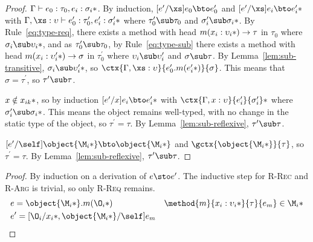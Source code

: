 \begin{theorem}[Preservation]
\begin{lemma}
\begin{proof}
      $\Gamma \vdash e_0 : \tau_0, \*e_i : \sigma_i*$.  By induction,
      $[e^\prime/\xs]e_0 \bto e^\prime_0$ and $\*[e^\prime/\xs]e_i \bto
      e^\prime_i*$ with $\Gamma, \xs : \upsilon \vdash e^\prime_0 :
      \tau_0^\prime, \*e^\prime_i : \sigma_i^\prime*$ where $\tau_0^\prime \sub
      \tau_0$ and $\*\sigma_i^\prime \sub \sigma_i*$.  By
      Rule~\ref{eq:type-req}, there exists a method with head $m(\*x_i :
      \upsilon_i*) \to \tau$ in $\tau_0$ where $\*\sigma_i \sub \upsilon_i*$,
      and as $\tau_0^\prime \sub \tau_0$, by Rule~\ref{eq:type-sub} there exists
      a method with head $m(\*x_i : \upsilon_i^\prime*) \to \sigma$ in
      $\tau_0^\prime$ where $\upsilon_i \sub \upsilon_i^\prime$ and
      $\sigma \sub \tau$.  By Lemma~\ref{lem:sub-transitive}, $\*\sigma_i
      \sub \upsilon_i^\prime*$, so $\ctx{\Gamma, \xs :
      \upsilon}{e_0^\prime.m(\*e_i^\prime*)}{\sigma}$.  This means that $\sigma
      = \tau^\prime$, so $\tau^\prime \sub \tau$.

      $x \notin \*x_{ik}*$, so by induction $\*[e^\prime/x]e_i \bto e_i^\prime*$
      with $\*\ctx{\Gamma, x : \upsilon}{e_i^\prime}{\sigma_i^\prime}*$ where
      $\*\sigma_i^\prime \sub \sigma_i*$.  This means the object remains
      well-typed, with no change in the static type of the object, so
      $\tau^\prime = \tau$.  By Lemma~\ref{lem:sub-reflexive}, $\tau^\prime
      \sub \tau$.

      $[e^\prime/\self]\object{\*\M_i*} \bto \object{\*\M_i*}$ and
      $\gctx{\object{\*\M_i*}}{\tau}$, so $\tau^\prime = \tau$.  By
      Lemma~\ref{lem:sub-reflexive}, $\tau^\prime \sub \tau$.
    \end{proof}
  \end{lemma}

  \begin{proof}
    By induction on a derivation of $e \sto e^\prime$.  The inductive step for
    \textsc{R-Rec} and \textsc{R-Arg} is trivial, so only \textsc{R-Req}
    remains.
%
    \begin{align*}
      &e = \object{\*\M_i*}.m(\*\O_i*) &
      \method{m}{\*x_i : \upsilon_i*}{\tau}{e_m} \in \*\M_i* \\
      &e^\prime = [\*\O_i/x_i*, \object{\*\M_i*}/\self]e_m &
    \end{align*}


\end{proof}
\end{theorem}
